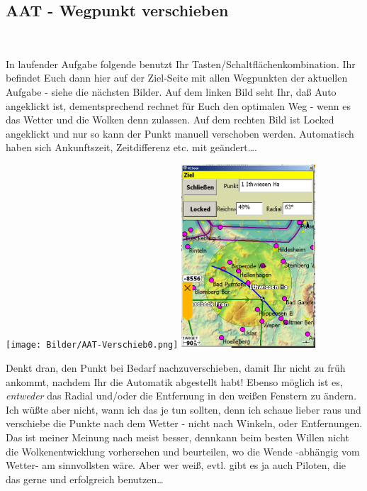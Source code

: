 \subsection{AAT - Wegpunkt verschieben}
\begin{center}
\blink~\blink~\blink~\bblitz
\end{center}
In laufender Aufgabe folgende benutzt Ihr Tasten/Schaltflächenkombination. Ihr befindet Euch dann hier auf der \textsf{Ziel}-Seite mit allen Wegpunkten der aktuellen Aufgabe - siehe die nächsten Bilder. Auf dem linken Bild seht Ihr, daß \textsf{Auto} angeklickt ist, dementsprechend rechnet \xc für Euch den optimalen Weg - wenn es das Wetter und die Wolken denn zulassen. Auf dem rechten Bild ist  \textsf{Locked} angeklickt und nur so kann der  Punkt manuell verschoben werden. Automatisch haben sich Ankunftszeit, Zeitdifferenz etc. mit geändert\dots.
\begin{center}
\texttt{[image: Bilder/AAT-Verschieb0.png]}%
\qquad
\includegraphics[width=5cm]{Bilder/AAT-Verschieb1.png}%
\end{center}
Denkt dran, den Punkt bei Bedarf nachzuverschieben, damit Ihr nicht zu früh ankommt, nachdem Ihr die Automatik abgestellt habt! Ebenso möglich ist es, \textsl{entweder} das Radial und/oder die Entfernung in den weißen Fenstern zu ändern. Ich wüßte aber nicht, wann ich das je tun sollten, denn ich schaue lieber raus und verschiebe die Punkte nach dem Wetter - nicht nach Winkeln, oder Entfernungen.
Das ist meiner Meinung nach meist besser, denn\xc kann beim besten Willen nicht die Wolkenentwicklung vorhersehen und beurteilen, wo die Wende -abhängig vom Wetter- am sinnvollsten wäre. Aber wer weiß, evtl. gibt es ja auch Piloten, die das gerne und erfolgreich benutzen\dots
%
